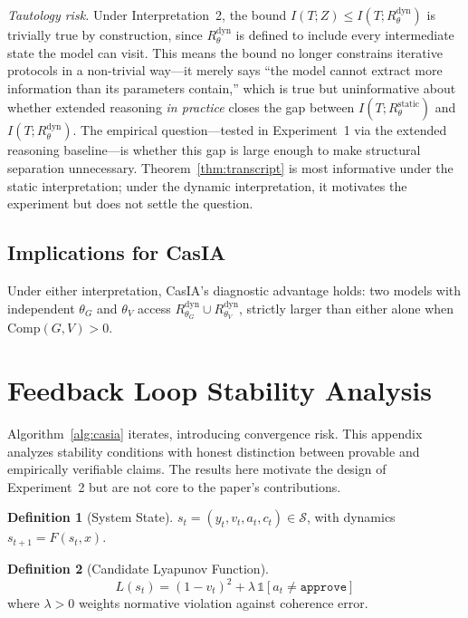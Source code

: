 \documentclass[11pt,a4paper]{article}
\theoremstyle{definition}
\newtheorem{definition}{Definition}[section]
\newcommand{\thetaG}{\theta_G}
\newcommand{\thetaV}{\theta_V}
\begin{document}
\emph{Tautology risk.} Under Interpretation~2, the bound $I(T;Z) \leq I(T; R_\theta^\text{dyn})$ is trivially true by construction, since $R_\theta^\text{dyn}$ is defined to include every intermediate state the model can visit. This means the bound no longer constrains iterative protocols in a non-trivial way---it merely says ``the model cannot extract more information than its parameters contain,'' which is true but uninformative about whether extended reasoning \emph{in practice} closes the gap between $I(T; R_\theta^\text{static})$ and $I(T; R_\theta^\text{dyn})$. The empirical question---tested in Experiment~1 via the extended reasoning baseline---is whether this gap is large enough to make structural separation unnecessary. Theorem~\ref{thm:transcript} is most informative under the static interpretation; under the dynamic interpretation, it motivates the experiment but does not settle the question.

\subsection{Implications for CasIA}

Under either interpretation, CasIA's diagnostic advantage holds: two models with independent $\thetaG$ and $\thetaV$ access $R_{\thetaG}^\text{dyn} \cup R_{\thetaV}^\text{dyn}$, strictly larger than either alone when $\mathrm{Comp}(G,V) > 0$.


\section{Feedback Loop Stability Analysis}
\label{app:stability}

Algorithm~\ref{alg:casia} iterates, introducing convergence risk. This appendix analyzes stability conditions with honest distinction between provable and empirically verifiable claims. The results here motivate the design of Experiment~2 but are not core to the paper's contributions.

\begin{definition}[System State]
$s_t = (y_t, v_t, a_t, c_t) \in \mathcal{S}$, with dynamics $s_{t+1} = F(s_t, x)$.
\end{definition}

\begin{definition}[Candidate Lyapunov Function]
\begin{equation}
L(s_t) = (1 - v_t)^2 + \lambda\, \mathbb{1}[a_t \neq \texttt{approve}]
\end{equation}
where $\lambda > 0$ weights normative violation against coherence error.
\end{definition}
\end{document}
